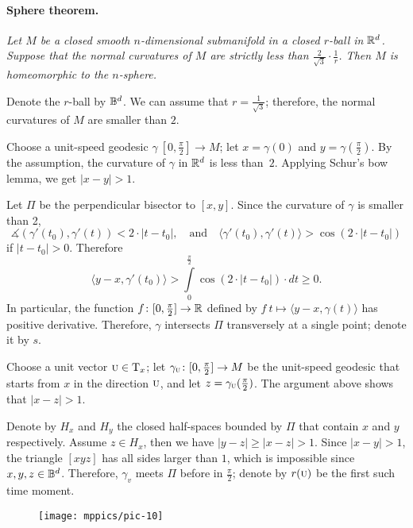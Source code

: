 \documentclass[a4paper,10pt]{article}
\begin{document}
\paragraph{Sphere theorem.}
\label{thm:strict}
\textit{Let $M$ be a closed smooth $n$-dimensional submanifold in a closed $r$-ball in $\mathbb{R}^d$.
Suppose that the normal curvatures of $M$ are strictly less than $\tfrac2{\sqrt{3}}\cdot\tfrac1r$.
Then $M$ is homeomorphic to the $n$-sphere.}


Denote the $r$-ball by $\mathbb{B}^d$.
We can assume that $r=\tfrac1{\sqrt{3}}$;
therefore, the normal curvatures of $M$ are smaller than $2$.

Choose a unit-speed geodesic $\gamma\:[0,\tfrac\pi2]\to M$;
let $x=\gamma(0)$ and $y=\gamma(\tfrac\pi2)$.
By the assumption, the curvature of $\gamma$ in $\mathbb{R}^d$ is less than~$2$.
Applying Schur's bow lemma, we get $|x-y|>1$.

Let $\Pi$ be the perpendicular bisector to $[x,y]$.
Since the curvature of $\gamma$ is smaller than 2,
\[\measuredangle(\gamma'(t_0),\gamma'(t))< 2\cdot|t-t_0|,
\quad\text{and}\quad
\langle \gamma'(t_0),\gamma'(t) \rangle> \cos (2\cdot|t-t_0|)\] if $|t-t_0|>0$.
Therefore
\[\langle y-x,\gamma'(t_0) \rangle>\int\limits_0^{\frac\pi2}\cos (2\cdot |t-t_0|)\cdot dt\ge0.\]
In particular, the function $f\colon[0,\tfrac\pi2]\to\mathbb{R}$ defined by
$f\:t\mapsto \langle y-x,\gamma(t) \rangle$
has positive derivative.
Therefore, $\gamma$ intersects $\Pi$ transversely at a single point;
denote it by $s$.



Choose a unit vector ${\normalfont\textsc{u}}\in\mathrm{T}_x$;
let $\gamma_{{\normalfont\textsc{u}}}\colon[0,\tfrac\pi2]\to M$ be the unit-speed geodesic that starts from $x$ in the direction ${{\normalfont\textsc{u}}}$, and let $z=\gamma_{{\normalfont\textsc{u}}}(\tfrac\pi2)$.
The argument above shows that $|x-z|>1$.

Denote by $H_x$ and $H_y$ the closed half-spaces bounded by $\Pi$ that contain $x$ and $y$ respectively.
Assume $z\in H_x$, then we have $|y-z|\ge |x-z|>1$.
Since $|x-y|>1$, the triangle $[xyz]$ has all sides larger than $1$,
which is impossible since $x,y,z\in \mathbb{B}^d$.
Therefore, $\gamma_v$ meets $\Pi$ before in $\tfrac\pi2$;
denote by $r({{\normalfont\textsc{u}}})$ be the first such time moment.

\begin{wrapfigure}{r}{44 mm}
\vskip-0mm
\centering
\texttt{[image: mppics/pic-10]}
\vskip2mm
\end{wrapfigure}
\end{document}
